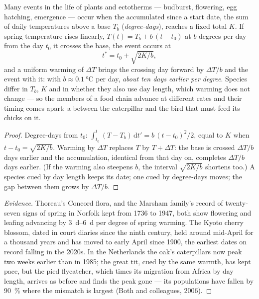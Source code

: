 \begin{theorem}\label{thm:b2:global-change:phenology}
Many events in the life of plants and ectotherms --- budburst,
flowering, egg hatching, emergence --- occur when the accumulated
\emph{} since a start date, the sum of daily
temperatures above a base $T_b$ (\emph{degree-days}), reaches a
fixed total $K$. If spring temperature rises linearly, $T(t) = T_b
+ b\,(t - t_0)$ at $b$ degrees per day from the day $t_0$ it crosses
the base, the event occurs at
\[
t^{*} = t_0 + \sqrt{2K/b},
\]
and a uniform warming of $\Delta T$ brings the crossing day forward
by $\Delta T/b$ and the event with it: with $b \approx
\qty{0.1}{\celsius}$ per day, \emph{about ten days earlier per
degree}. Species differ in $T_b$, $K$ and in whether they also use
day length, which warming does not change --- so the members of a
food chain advance at different rates and their timing comes
apart: a \emph{} between the caterpillar and
the bird that must feed its chicks on it.
\end{theorem}
\begin{proof}
Degree-days from $t_0$: $\int_{t_0}^{t}(T - T_b)\,\mathrm{d}t' =
b\,(t - t_0)^{2}/2$, equal to $K$ when $t - t_0 = \sqrt{2K/b}$.
Warming by $\Delta T$ replaces $T$ by $T + \Delta T$: the base is
crossed $\Delta T/b$ days earlier and the accumulation, identical
from that day on, completes $\Delta T/b$ days earlier. (If the
warming also steepens $b$, the interval $\sqrt{2K/b}$ shortens
too.) A species cued by day length keeps its date; one cued by
degree-days moves; the gap between them grows by $\Delta T/b$.
\end{proof}
\begin{proof}[Evidence]
Thoreau's Concord flora, and the Marsham family's record of
twenty-seven signs of spring in Norfolk kept from 1736 to 1947,
both show flowering and leafing advancing by \qtyrange{3}{6}{d}
per degree of spring warming. The Kyoto cherry blossom, dated in
court diaries since the ninth century, held around mid-April for a
thousand years and has moved to early April since 1900, the
earliest dates on record falling in the 2020s. In the Netherlands
the oak's caterpillars now peak two weeks earlier than in 1985; the
great tit, cued by the same warmth, has kept pace, but the pied
flycatcher, which times its migration from Africa by day length,
arrives as before and finds the peak gone --- its populations have
fallen by \qty{90}{\%} where the mismatch is largest (Both and
colleagues, 2006).
\end{proof}

